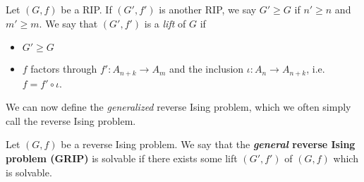 \begin{defn}\label{defn:rev-ising-lift}
	Let $(G,f)$ be a RIP. If $(G',f')$ is another RIP, we say $G' \geq G$ if $n'\geq n$ and $m'\geq m$. We say that $(G',f')$ is a \emph{lift} of $G$ if 
	\begin{itemize}
		\item $G' \geq G$
		\item $f$ factors through $f':A_{n+k}\to A_m$ and the inclusion $\iota:A_n\to A_{n+k}$, i.e. $f = f'\circ \iota$.
	\end{itemize}
\end{defn}
We can now define the \emph{generalized} reverse Ising problem, which we often simply call the reverse Ising problem.
\begin{problem}\label{prop:gen-rev-ising}
	Let $(G,f)$ be a reverse Ising problem. We say that the \textbf{\emph{general} reverse Ising problem (GRIP)} is solvable if there exists some lift $(G',f')$ of $(G,f)$ which is solvable.
\end{problem}

